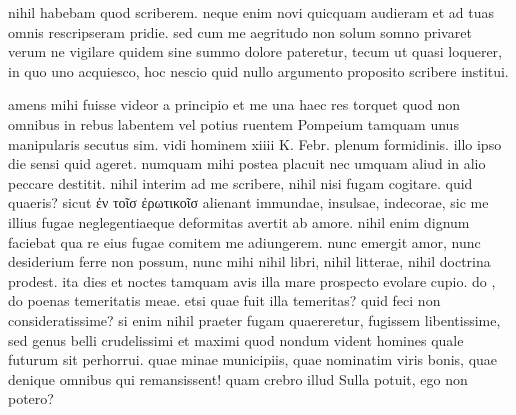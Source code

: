 


 nihil habebam quod scriberem. neque enim novi quicquam audieram et ad tuas omnis rescripseram pridie. sed cum me aegritudo non solum somno privaret verum ne vigilare quidem sine summo dolore pateretur, tecum ut quasi loquerer, in quo uno acquiesco, hoc nescio quid nullo argumento proposito scribere institui.

 amens mihi fuisse videor a principio et me una haec res torquet quod non omnibus in rebus labentem vel potius ruentem Pompeium tamquam unus manipularis secutus sim. vidi hominem xiiii K. Febr. plenum formidinis. illo ipso die sensi quid ageret. numquam mihi postea placuit nec umquam aliud in alio peccare destitit. nihil interim ad me scribere, nihil nisi fugam cogitare. quid quaeris? sicut ἐν τοῖσ ἐρωτικοῖσ alienant immundae, insulsae, indecorae, sic me illius fugae neglegentiaeque deformitas avertit ab amore. nihil enim dignum faciebat qua re eius fugae comitem me adiungerem. nunc emergit amor, nunc desiderium ferre non possum, nunc mihi nihil libri, nihil litterae, nihil doctrina prodest. ita dies et noctes tamquam avis illa mare prospecto evolare cupio. do , do poenas temeritatis meae. etsi quae fuit illa temeritas? quid feci non consideratissime? si enim nihil praeter fugam quaereretur, fugissem libentissime, sed genus belli crudelissimi et maximi quod nondum vident homines quale futurum sit perhorrui. quae minae municipiis, quae nominatim viris bonis, quae denique omnibus qui remansissent! quam crebro illud Sulla potuit, ego non potero?

